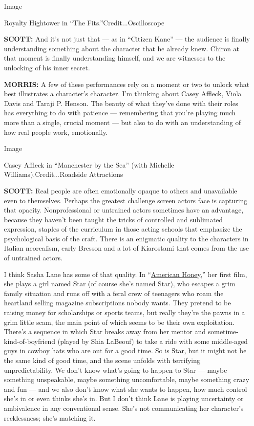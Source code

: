 Image

Royalty Hightower in ``The Fits.''Credit...Oscilloscope

\textbf{SCOTT:} And it's not just that --- as in ``Citizen Kane'' ---
the audience is finally understanding something about the character that
he already knew. Chiron at that moment is finally understanding himself,
and we are witnesses to the unlocking of his inner secret.

\textbf{MORRIS:} A few of these performances rely on a moment or two to
unlock what best illustrates a character's character. I'm thinking about
Casey Affleck, Viola Davis and Taraji P. Henson. The beauty of what
they've done with their roles has everything to do with patience ---
remembering that you're playing much more than a single, crucial moment
--- but also to do with an understanding of how real people work,
emotionally.

Image

Casey Affleck in ``Manchester by the Sea'' (with Michelle
Williams).Credit...Roadside Attractions

\textbf{SCOTT:} Real people are often emotionally opaque to others and
unavailable even to themselves. Perhaps the greatest challenge screen
actors face is capturing that opacity. Nonprofessional or untrained
actors sometimes have an advantage, because they haven't been taught the
tricks of controlled and sublimated expression, staples of the
curriculum in those acting schools that emphasize the psychological
basis of the craft. There is an enigmatic quality to the characters in
Italian neorealism, early Bresson and a lot of Kiarostami that comes
from the use of untrained actors.

I think Sasha Lane has some of that quality. In
``\href{https://www.nytimes3xbfgragh.onion/2016/10/02/movies/american-honey-open-highways-free-spirits.html}{American
Honey},'' her first film, she plays a girl named Star (of course she's
named Star), who escapes a grim family situation and runs off with a
feral crew of teenagers who roam the heartland selling magazine
subscriptions nobody wants. They pretend to be raising money for
scholarships or sports teams, but really they're the pawns in a grim
little scam, the main point of which seems to be their own exploitation.
There's a sequence in which Star breaks away from her mentor and
sometime-kind-of-boyfriend (played by Shia LaBeouf) to take a ride with
some middle-aged guys in cowboy hats who are out for a good time. So is
Star, but it might not be the same kind of good time, and the scene
unfolds with terrifying unpredictability. We don't know what's going to
happen to Star --- maybe something unspeakable, maybe something
uncomfortable, maybe something crazy and fun --- and we also don't know
what she wants to happen, how much control she's in or even thinks she's
in. But I don't think Lane is playing uncertainty or ambivalence in any
conventional sense. She's not communicating her character's
recklessness; she's matching it.

